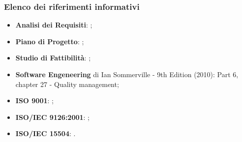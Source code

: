 		\subsubsection{Elenco dei riferimenti informativi}
			\begin{itemize}
				\item \textbf{Analisi dei Requisiti}: ;
				\item \textbf{Piano di Progetto}: ;
				\item \textbf{Studio di Fattibilità}: ;
				\item \textbf{Software Engeneering} di Ian Sommerville - 9th Edition (2010): Part 6, chapter 27 - Quality management;
				\item \textbf{ISO 9001}: ;
				\item \textbf{ISO/IEC 9126:2001}: ;
				\item \textbf{ISO/IEC 15504}: .
			\end{itemize}
